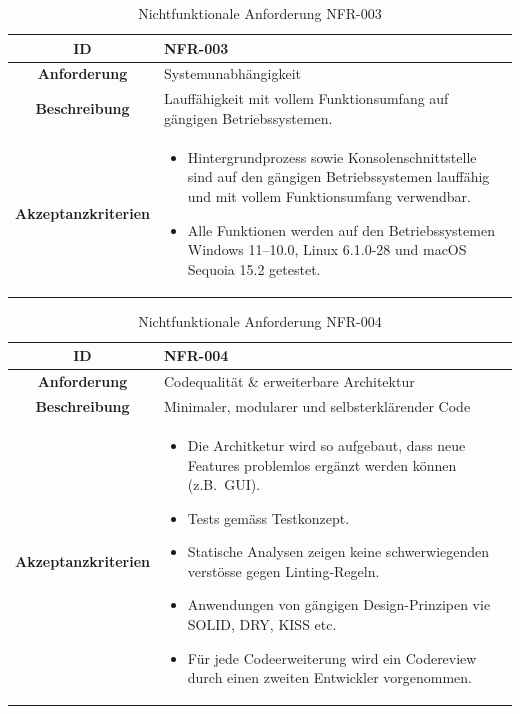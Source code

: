 \documentclass[a4paper,12pt]{report}
\begin{document}
    \begin{table}[h!]
        \centering
        \setlength{\leftmargini}{0.4cm}
        \begin{tabular}{|c|p{10cm}|}
            \hline
            \textbf{ID}           & NFR-003                                                                 \\ \hline
            \textbf{Anforderung}  & Systemunabhängigkeit                                                    \\ \hline
            \textbf{Beschreibung} & Lauffähigkeit mit vollem Funktionsumfang auf gängigen Betriebssystemen. \\ \hline
            \textbf{Akzeptanzkriterien} &
            \begin{itemize}
                \item Hintergrundprozess sowie Konsolenschnittstelle sind auf den gängigen Betriebssystemen lauffähig und mit vollem Funktionsumfang verwendbar.
                \item Alle Funktionen werden auf den Betriebssystemen Windows 11--10.0, Linux 6.1.0-28 und macOS Sequoia 15.2 getestet.
            \end{itemize}
            \\ \hline
        \end{tabular}
        \caption{Nichtfunktionale Anforderung NFR-003}\label{tab:table5}
    \end{table}
    \clearpage
    \begin{table}[h!]
        \centering
        \setlength{\leftmargini}{0.4cm}
        \begin{tabular}{|c|p{10cm}|}
            \hline
            \textbf{ID}           & NFR-004                                         \\ \hline
            \textbf{Anforderung}  & Codequalität \& erweiterbare Architektur        \\ \hline
            \textbf{Beschreibung} & Minimaler, modularer und selbsterklärender Code \\ \hline
            \textbf{Akzeptanzkriterien} &
            \begin{itemize}
                \item Die Architketur wird so aufgebaut, dass neue Features problemlos ergänzt werden können (z.B.\ GUI).
                \item Tests gemäss Testkonzept.
                \item Statische Analysen zeigen keine schwerwiegenden verstösse gegen Linting-Regeln.
                \item Anwendungen von gängigen Design-Prinzipen vie SOLID, DRY, KISS etc.
                \item Für jede Codeerweiterung wird ein Codereview durch einen zweiten Entwickler vorgenommen.
            \end{itemize}
            \\ \hline
        \end{tabular}
        \caption{Nichtfunktionale Anforderung NFR-004}\label{tab:table6}
    \end{table}
\end{document}
